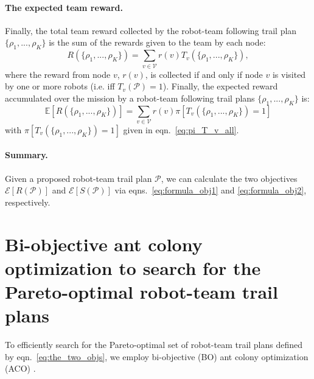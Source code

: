 \documentclass[11pt, oneside]{article}
\begin{document}
\paragraph{The expected team reward.}
Finally, the total team reward collected by the robot-team following trail plan $\{\rho_1, ..., \rho_K\}$ is the sum of the rewards given to the team by each node:
\begin{equation}
R(\{\rho_1,...,\rho_K\}) = \sum_{v\in\mathcal{V}} r(v)  T_v(\{\rho_1, ..., \rho_K\}),
\end{equation} where the reward from node $v$, $r(v)$, is collected if and only if node $v$ is visited by one or more robots (i.e. iff $T_v(\mathcal{P})=1$).
Finally, the expected reward accumulated over the mission by a robot-team following trail plans $\{\rho_1, ..., \rho_K\}$ is:
\begin{equation}
	\mathbb{E}[R(\{\rho_1,...,\rho_K\})]= \sum_{v\in\mathcal{V}} r(v) \pi[T_v(\{\rho_1, ..., \rho_K\}) = 1] \label{eq:formula_obj1}
\end{equation}
with $ \pi[T_v(\{\rho_1, ..., \rho_K\}) = 1]$ given in eqn.~\ref{eq:pi_T_v_all}.

\paragraph{Summary.} Given a proposed robot-team trail plan $\mathcal{P}$, we can calculate the two objectives $\mathcal{E}[R(\mathcal{P})]$ and $\mathcal{E}[S(\mathcal{P})]$ via eqns.~\ref{eq:formula_obj1} and \ref{eq:formula_obj2}, respectively.

\section{Bi-objective ant colony optimization to search for the Pareto-optimal robot-team trail plans}
To efficiently search for the Pareto-optimal set of robot-team trail plans defined by eqn.~\ref{eq:the_two_objs}, we employ bi-objective (BO) ant colony optimization (ACO) \cite{iredi2001bi}. 
\end{document}
